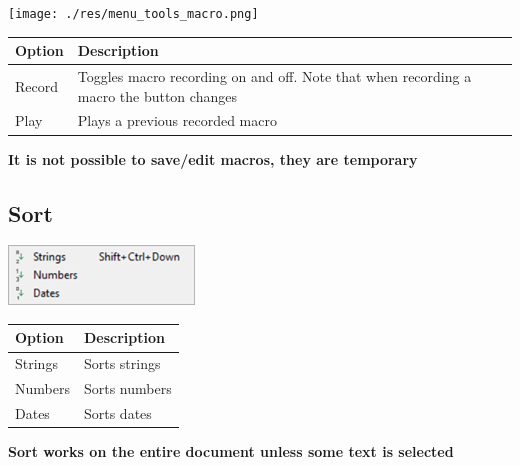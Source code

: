 \texttt{[image: ./res/menu\_tools\_macro.png]}\\

\begin{scriptsize}
  \begin{tabularx}{\textwidth}{>{\hsize=0.3\hsize}X>{\hsize=0.7\hsize}X}\\
    \hline
    \textbf{Option} & \textbf{Description} \\
    \hline
    Record & Toggles macro recording on and off. Note that when recording a macro the button changes \\
    Play & Plays a previous recorded macro \\
    \hline
  \end{tabularx}
\end{scriptsize}

\textbf{It is not possible to save/edit macros, they are temporary}


\hypertarget{menu_tools_sort}{}
\subsection{Sort}

\includegraphics[scale=0.50]{./res/menu_tools_sort.png}\\

\begin{scriptsize}
  \begin{tabularx}{\textwidth}{>{\hsize=0.3\hsize}X>{\hsize=0.7\hsize}X}\\
    \hline
    \textbf{Option} & \textbf{Description} \\
    \hline
    Strings & Sorts strings \\
    Numbers & Sorts numbers \\
    Dates & Sorts dates \\
    \hline
  \end{tabularx}
\end{scriptsize}

\textbf{Sort works on the entire document unless some text is selected}

